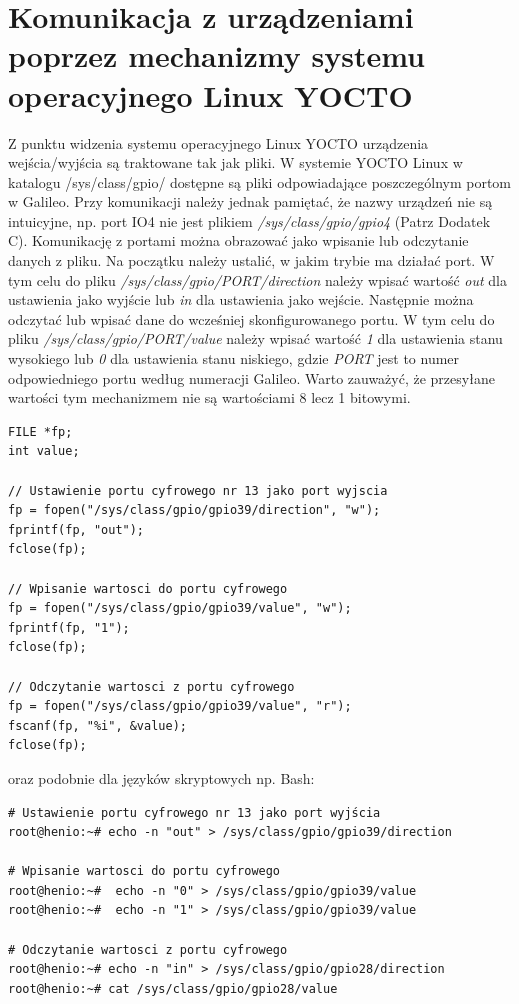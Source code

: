 \documentclass{xmgr}
\begin{document}
\section{Komunikacja z urządzeniami poprzez mechanizmy systemu operacyjnego Linux YOCTO}
Z punktu widzenia systemu operacyjnego Linux YOCTO urządzenia wejścia/wyjścia są traktowane tak jak pliki. W systemie YOCTO Linux w katalogu /sys/class/gpio/ dostępne są pliki odpowiadające poszczególnym portom w Galileo. Przy komunikacji należy jednak pamiętać, że nazwy urządzeń nie są intuicyjne, np. port IO4 nie jest plikiem \emph{/sys/class/gpio/gpio4} (Patrz Dodatek C). Komunikację z portami można obrazować jako wpisanie lub odczytanie danych z pliku. Na początku należy ustalić, w jakim trybie ma działać port. W tym celu do pliku \emph{/sys/class/gpio/PORT/direction} należy wpisać wartość \emph{out} dla ustawienia jako wyjście lub \emph{in} dla ustawienia jako wejście. Następnie można odczytać lub wpisać dane do wcześniej skonfigurowanego portu. W tym celu do pliku \emph{/sys/class/gpio/PORT/value} należy wpisać wartość \emph{1} dla ustawienia stanu wysokiego lub \emph{0} dla ustawienia stanu niskiego, gdzie \emph{PORT} jest to numer odpowiedniego portu według numeracji Galileo. Warto zauważyć, że przesyłane wartości tym mechanizmem nie są wartościami 8 lecz 1 bitowymi.

\begin{lstlisting}[label=bot-dirs-alg,caption=Obsługa portu cyfrowego w środowisku Linux za pomocą języka C/C++]
FILE *fp;
int value;

// Ustawienie portu cyfrowego nr 13 jako port wyjscia
fp = fopen("/sys/class/gpio/gpio39/direction", "w");
fprintf(fp, "out");
fclose(fp);

// Wpisanie wartosci do portu cyfrowego
fp = fopen("/sys/class/gpio/gpio39/value", "w");
fprintf(fp, "1");
fclose(fp);

// Odczytanie wartosci z portu cyfrowego
fp = fopen("/sys/class/gpio/gpio39/value", "r");
fscanf(fp, "%i", &value);
fclose(fp);
\end{lstlisting}

oraz podobnie dla języków skryptowych np. Bash:

\begin{lstlisting}[label=bot-dirs-alg,caption=Obsługa portu cyfrowego w środowisku Linux (bash)]
# Ustawienie portu cyfrowego nr 13 jako port wyjścia
root@henio:~# echo -n "out" > /sys/class/gpio/gpio39/direction

# Wpisanie wartosci do portu cyfrowego
root@henio:~#  echo -n "0" > /sys/class/gpio/gpio39/value
root@henio:~#  echo -n "1" > /sys/class/gpio/gpio39/value

# Odczytanie wartosci z portu cyfrowego
root@henio:~# echo -n "in" > /sys/class/gpio/gpio28/direction
root@henio:~# cat /sys/class/gpio/gpio28/value
\end{lstlisting}
\end{document}
